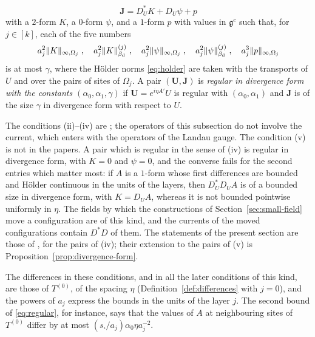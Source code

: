 \documentclass[11pt]{preprint}
\DeclarePairedDelimiter{\norm}{\lVert}{\rVert}
\numberwithin{equation}{section}
\begin{document}
\begin{definition}
\begin{enumerate}[label=(\roman*)]
\begin{equation}\label{eq:divergence-form}
    \mathbf J = D^*_UK + D_U\psi + p
\end{equation}
with a $2$-form $K$, a $0$-form $\psi$, and a $1$-form $p$ with values in $\mathfrak g^c$ such that, for $j \in [k]$, each of the five numbers
\begin{equation}\label{eq:divergence-size}
    a_j^2\norm K_{\infty,\Omega_j}\;,\quad
    a_j^2\norm K^{(j)}_{\beta_{\mathrm d}}\;,\quad
    a_j^2\norm\psi_{\infty,\Omega_j}\;,\quad
    a_j^2\norm\psi^{(j)}_{\beta_{\mathrm d}}\;,\quad
    a_j^3\norm p_{\infty,\Omega_j}
\end{equation}
is at most $\gamma$, where the H\"older norms \eqref{eq:holder} are taken with the transports of $U$ and over the pairs of sites of $\Omega_j$. A pair $(\mathbf U, \mathbf J)$ is \emph{regular in divergence form with the constants $(\alpha_0, \alpha_1, \gamma)$} if $\mathbf U = e^{i\eta A'}U$ is regular with $(\alpha_0, \alpha_1)$ and $\mathbf J$ is of the size $\gamma$ in divergence form with respect to $U$.
\end{enumerate}
\end{definition}

The conditions (ii)--(iv) are \cite[(3.35)--(3.38), p.~396]{BalabanPBG}; the operators of this subsection do not involve the current, which enters with the operators of the Landau gauge. The condition (v) is not in the papers. A pair which is regular in the sense of (iv) is regular in divergence form, with $K = 0$ and $\psi = 0$, and the converse fails for the second entries which matter most: if $A$ is a $1$-form whose first differences are bounded and H\"older continuous in the units of the layers, then $D^*_UD_UA$ is of a bounded size in divergence form, with $K = D_UA$, whereas it is not bounded pointwise uniformly in $\eta$. The fields by which the constructions of Section~\ref{sec:small-field} move a configuration are of this kind, and the currents of the moved configurations contain $D^*D$ of them. The statements of the present section are those of \cite{BalabanPBG}, for the pairs of (iv); their extension to the pairs of (v) is Proposition~\ref{prop:divergence-form}.

The differences in these conditions, and in all the later conditions of this kind, are those of $T^{(0)}$, of the spacing $\eta$ (Definition~\ref{def:differences} with $j = 0$), and the powers of $a_j$ express the bounds in the units of the layer $j$. The second bound of \eqref{eq:regular}, for instance, says that the values of $A$ at neighbouring sites of $T^{(0)}$ differ by at most $(s_\square/a_j)\alpha_0\eta a_j^{-2}$.
\end{document}

